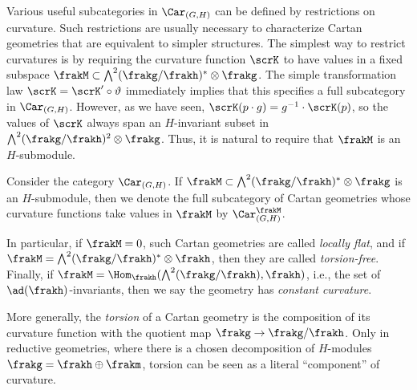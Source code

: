 Various useful subcategories in $\Car_{(G,H)}$ can be defined by restrictions on curvature. Such restrictions are usually necessary to characterize Cartan geometries that are equivalent to simpler structures. The simplest way to restrict curvatures is by requiring the curvature function $\scrK$ to have values in a fixed subspace $\frakM\subset \bigwedge^2(\frakg\slash\frakh)^\ast\otimes\frakg$. The simple transformation law $\scrK=\scrK'\circ \vartheta$ immediately implies that this specifies a full subcategory in $\Car_{(G,H)}$. However, as we have seen, $\scrK(p\cdot g)=g^{-1}\cdot \scrK(p)$, so the values of $\scrK$ always span an $H$-invariant subset in $\bigwedge^2(\frakg\slash\frakh)^2\otimes\frakg$. Thus, it is natural to require that $\frakM$ is an $H$-submodule. 

\begin{defn}\label{def category of cartan geom}
    Consider the category $\Car_{(G,H)}$. If $\frakM\subset \bigwedge^2(\frakg\slash\frakh)^\ast\otimes\frakg$ is an $H$-submodule, then we denote the full subcategory of Cartan geometries whose curvature functions take values in $\frakM$ by $\Car_{(G,H)}^\frakM$.

    In particular, if $\frakM=0$, such Cartan geometries are called \emph{locally flat}, and if $\frakM=\bigwedge^2(\frakg\slash\frakh)^\ast\otimes\frakh$, then they are called \emph{torsion-free}. Finally, if $\frakM=\Hom_\frakh(\bigwedge^2(\frakg\slash\frakh), \frakh)$, i.e., the set of $\ad(\frakh)$-invariants, then we say the geometry has \emph{constant curvature}.
\end{defn}

More generally, the \emph{torsion} of a Cartan geometry is the composition of its curvature function with the quotient map $\frakg\to \frakg\slash\frakh$. Only in reductive geometries, where there is a chosen decomposition of $H$-modules $\frakg=\frakh\oplus\frakm$, torsion can be seen as a literal ``component'' of curvature.


